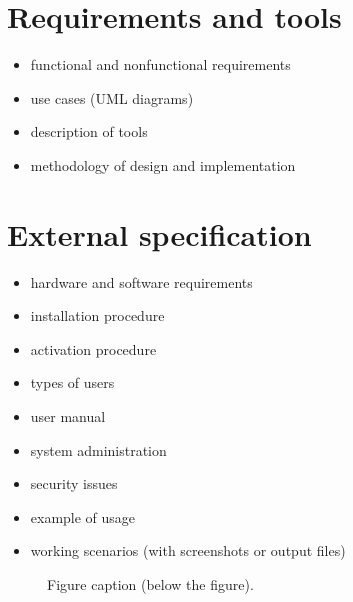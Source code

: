 \documentclass[a4paper,twoside,12pt]{book}
\begin{document}


 
\chapter{Requirements and tools}

\begin{itemize}
\item functional and nonfunctional requirements
\item use cases (UML diagrams)
\item description of tools
\item methodology of design and implementation
\end{itemize}  
\chapter{External specification}
\begin{itemize}
\item hardware and software requirements
\item installation procedure
\item activation procedure
\item types of users
\item user manual
\item system administration
\item security issues
\item example of usage
\item working scenarios (with screenshots or output files)
\end{itemize}



 
\begin{figure}
\centering
{}
\caption{Figure caption (below the figure).}
\label{fig:2}
\end{figure}
\end{document}
